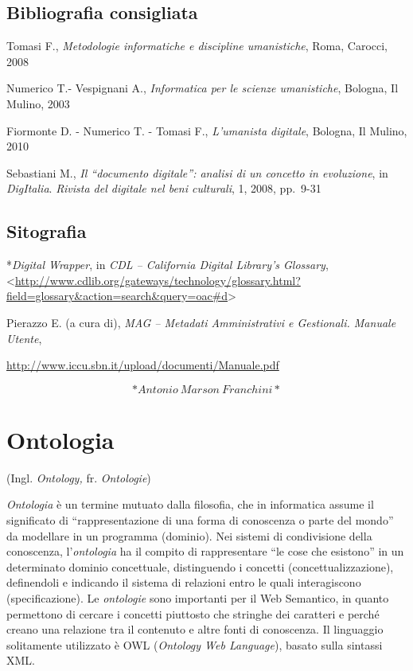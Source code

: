 \documentclass[
  b5paper,
  twoside,
  12pt,
  chapterprefix=false,
  bibliography=totocnumbered,
  parskip=false]{scrbook}
\begin{document}
\hypertarget{bibliografia-consigliata-17}{%
\section*{Bibliografia consigliata}\label{bibliografia-consigliata-17}}

Tomasi F., \emph{Metodologie informatiche e discipline umanistiche}, Roma,
Carocci, 2008

Numerico T.- Vespignani A., \emph{Informatica per le scienze umanistiche},
Bologna, Il Mulino, 2003

Fiormonte D. - Numerico T. - Tomasi F., \emph{L'umanista digitale}, Bologna,
Il Mulino, 2010

Sebastiani M., \emph{Il \enquote{documento digitale}: analisi di un concetto in
evoluzione}, in \emph{DigItalia}. \emph{Rivista del digitale nel beni culturali},
1, 2008, pp.~9-31

\hypertarget{sitografia-23}{%
\section*{Sitografia}\label{sitografia-23}}

*\emph{Digital Wrapper}, in \emph{CDL -- California Digital Library's Glossary},
\textless{}\href{http://www.cdlib.org/gateways/technology/glossary.html?field=glossary\&action=search\&query=oac\#d}{{http://www.cdlib.org/gateways/technology/glossary.html?field=glossary\&action=search\&query=oac\#d}}\textgreater{}

Pierazzo E. (a cura di), \emph{MAG -- Metadati Amministrativi e Gestionali.
Manuale Utente},

\url{http://www.iccu.sbn.it/upload/documenti/Manuale.pdf}

\[*Antonio~Marson~Franchini*\]

\hypertarget{ontologia}{%
\chapter{Ontologia}\label{ontologia}}

(Ingl. \emph{Ontology,} fr. \emph{Ontologie})

\emph{Ontologia} è un termine mutuato dalla filosofia, che in informatica
assume il significato di \enquote{rappresentazione di una forma di conoscenza o
parte del mondo} da modellare in un programma (dominio). Nei sistemi di
condivisione della conoscenza, l'\emph{ontologia} ha il compito di
rappresentare \enquote{le cose che esistono} in un determinato dominio
concettuale, distinguendo i concetti (concettualizzazione), definendoli
e indicando il sistema di relazioni entro le quali interagiscono
(specificazione). Le \emph{ontologie} sono importanti per il Web Semantico,
in quanto permettono di cercare i concetti piuttosto che stringhe dei
caratteri e perché creano una relazione tra il contenuto e altre fonti
di conoscenza. Il linguaggio solitamente utilizzato è OWL (\emph{Ontology Web
Language}), basato sulla sintassi XML.
\end{document}
